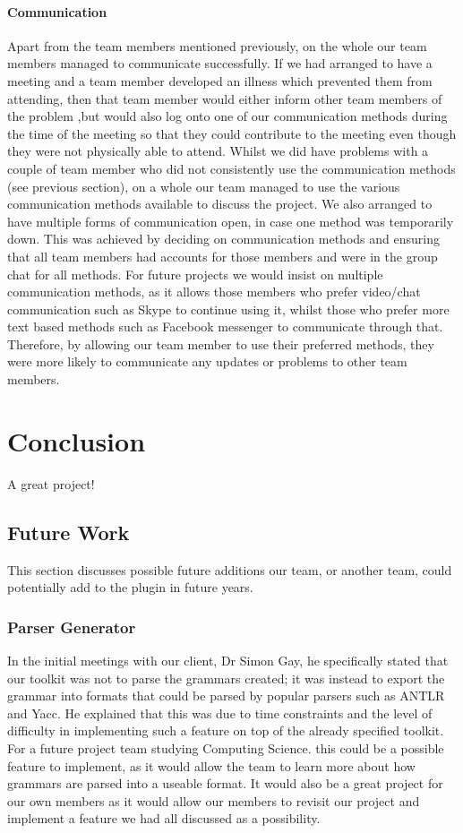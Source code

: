 \documentclass{l3proj}
\begin{document}
\subsubsection{Communication}
Apart from the team members mentioned previously, on the whole our team members managed to communicate successfully. If we had arranged to have a meeting and a team member developed an illness which prevented them from attending, then that team member would either inform other team members of the problem ,but would also log onto one of our communication methods during the time of the meeting so that they could contribute to the meeting even though they were not physically able to attend. Whilst we did have problems with a couple of team member who did not consistently use the communication methods (see previous section), on a whole our team managed to use the various communication methods available to discuss the project. We also arranged to have multiple forms of communication open, in case one method was temporarily down. This was achieved by deciding on communication methods and ensuring that all team members had accounts for those members and were in the group chat for all methods. For future projects we would insist on multiple communication methods, as it allows those members who prefer video/chat communication such as Skype to continue using it, whilst those who prefer more text based methods such as Facebook messenger to communicate through that. Therefore, by allowing our team member to use their preferred methods, they were more likely to communicate any updates or problems to other team members. 

\chapter{Conclusion}

A great project!

\section{Future Work}
This section discusses possible future additions our team, or another team, could potentially add to the plugin in future years. 

\subsection{Parser Generator}
In the initial meetings with our client, Dr Simon Gay, he specifically stated that our toolkit was not to parse the grammars created; it was instead to export the grammar into formats that could be parsed by popular parsers such as ANTLR and Yacc. He explained that this was due to time constraints and the level of difficulty in implementing such a feature on top of the already specified toolkit. For a future project team studying Computing Science. this could be a possible feature to implement, as it would allow the team to learn more about how grammars are parsed into a useable format. It would also be a great project for our own members as it would allow our members to revisit our project and implement a feature we had all discussed as a possibility. 
\end{document}
